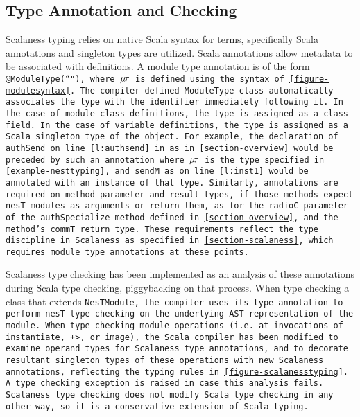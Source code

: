 \subsection{Type Annotation and Checking}

Scalaness typing relies on native Scala syntax for terms, specifically Scala annotations and
singleton types are utilized. Scala annotations allow metadata to be associated with
definitions. A module type annotation is of the form \tt{@ModuleType(\tt{``}\jmodtcat\tt{"})},
where $\mu\!\tau$ is defined using the syntax of \autoref{figure-modulesyntax}. The
compiler-defined \tt{ModuleType} class automatically associates the type with the identifier
immediately following it. In the case of module class definitions, the type is assigned as a
class field. In the case of variable definitions, the type is assigned as a Scala singleton type
of the object. For example, the declaration of \tt{authSend} on line \ref{l:authsend} in as in
\autoref{section-overview} would be preceded by such an annotation where $\mu\!\tau$ is the type
specified in \autoref{example-nesttyping}, and \tt{sendM} as on line \ref{l:inst1} would be
annotated with an instance of that type. Similarly, annotations are required on method parameter
and result types, if those methods expect nesT modules as arguments or return them, as for the
\tt{radioC} parameter of the \tt{authSpecialize} method defined in \autoref{section-overview},
and the method's \tt{commT} return type. These requirements reflect the type discipline in
Scalaness as specified in \autoref{section-scalaness}, which requires module type annotations at
these points.

Scalaness type checking has been implemented as an analysis of these annotations during Scala
type checking, piggybacking on that process. When type checking a class that extends
\tt{NesTModule}, the compiler uses its type annotation to perform nesT type checking on the
underlying AST representation of the module. When type checking module operations (i.e.~at
invocations of \tt{instantiate}, \verb!+>!, or \tt{image}), the Scala compiler has been modified
to examine operand types for Scalaness type annotations, and to decorate resultant singleton
types of these operations with new Scalaness annotations, reflecting the typing rules in
\autoref{figure-scalanesstyping}. A type checking exception is raised in case this analysis
fails. Scalaness type checking does not modify Scala type checking in any other way, so it is a
conservative extension of Scala typing.

